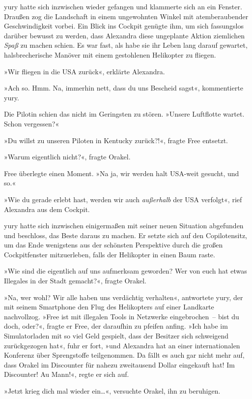 yury hatte sich inzwischen wieder gefangen und klammerte sich an ein Fenster. Draußen zog die Landschaft in einem ungewohnten Winkel mit atemberaubender Geschwindigkeit vorbei. Ein Blick ins Cockpit genügte ihm, um sich fassungslos darüber bewusst zu werden, dass Alexandra diese ungeplante Aktion ziemlichen \emph{Spaß} zu machen schien. Es war fast, als habe sie ihr Leben lang darauf gewartet, halsbrecherische Manöver mit einem gestohlenen Helikopter zu fliegen.

»Wir fliegen in die USA zurück«, erklärte Alexandra.

»Ach so. Hmm. Na, immerhin nett, dass du uns Bescheid sagst«, kommentierte yury.

Die Pilotin schien das nicht im Geringsten zu stören. »Unsere Luftflotte wartet. Schon vergessen?«

»Du willst zu unseren Piloten in Kentucky zurück?!«, fragte Free entsetzt.

»Warum eigentlich nicht?«, fragte Orakel.

Free überlegte einen Moment. »Na ja, wir werden halt USA-weit gesucht, und so.«

»Wie du gerade erlebt hast, werden wir auch \emph{außerhalb} der USA verfolgt«, rief Alexandra aus dem Cockpit.

yury hatte sich inzwischen einigermaßen mit seiner neuen Situation abgefunden und beschloss, das Beste daraus zu machen. Er setzte sich auf den Copilotensitz, um das Ende wenigstens aus der schönsten Perspektive durch die großen Cockpitfenster mitzuerleben, falls der Helikopter in einen Baum raste.

»Wie sind die eigentlich auf uns aufmerksam geworden? Wer von euch hat etwas Illegales in der Stadt gemacht?«, fragte Orakel.

»Na, wer wohl? Wir alle haben uns verdächtig verhalten«, antwortete yury, der mit seinem Smartphone den Flug des Helikopters auf einer Landkarte nachvollzog. »Free ist mit illegalen Tools in Netzwerke eingebrochen~– bist du doch, oder?«, fragte er Free, der daraufhin zu pfeifen anfing. »Ich habe im Simulatorladen mit so viel Geld gespielt, dass der Besitzer sich schweigend zurückgezogen hat«, fuhr er fort, »und Alexandra hat an einer internationalen Konferenz über Sprengstoffe teilgenommen. Da fällt es auch gar nicht mehr auf, dass Orakel im Discounter für nahezu zweitausend Dollar eingekauft hat! Im Discounter! Au Mann!«, regte er sich auf.

»Jetzt krieg dich mal wieder ein…«, versuchte Orakel, ihn zu beruhigen.

